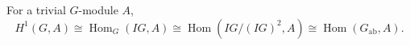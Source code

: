 For a trivial $G$-module $A$,
$$H^1(G, A) \cong \operatorname{Hom}_G(IG, A) \cong \operatorname{Hom}(IG/(IG)^2, A) \cong \operatorname{Hom}(G_{\mathrm{ab}}, A).$$
